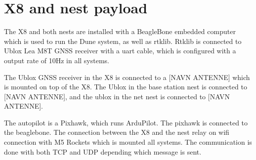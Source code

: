 \section{X8 and nest payload}
The X8 and both nests are installed with a BeagleBone embedded computer which is used to run the Dune system, as well as rtklib. Rtklib is connected to Ublox Lea M8T GNSS receiver with a uart cable, which is configured with a output rate of 10Hz in all systems.

The Ublox GNSS receiver in the X8 is connected to a [NAVN ANTENNE] which is mounted on top of the X8. The Ublox in the base station nest is connected to [NAVN ANTENNE], and the ublox in the net nest is connected to [NAVN ANTENNE].

The autopilot is a Pixhawk, which runs ArduPilot. The pixhawk is connected to the beaglebone. The connection between the X8 and the nest relay on wifi connection with M5 Rockets which is mounted all systems. The communication is done with both TCP and UDP depending which message is sent.